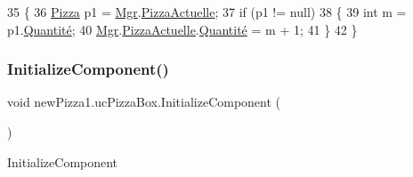 \begin{DoxyCode}
35         \{
36             \hyperlink{classModele_1_1Pizza}{Pizza} p1 = \hyperlink{classnewPizza1_1_1ucPizzaBox_a236b692b1cd3447fc57d5ddfcbea57fc}{Mgr}.\hyperlink{classModele_1_1Manager_a7e69844aeeebbc80144850efc0d2b94c}{PizzaActuelle};
37             \textcolor{keywordflow}{if} (p1 != null)
38             \{
39                 \textcolor{keywordtype}{int} m = p1.\hyperlink{classModele_1_1Pizza_ae755ca79feb6f9a522aa18544c3f1310}{Quantité};
40                 \hyperlink{classnewPizza1_1_1ucPizzaBox_a236b692b1cd3447fc57d5ddfcbea57fc}{Mgr}.\hyperlink{classModele_1_1Manager_a7e69844aeeebbc80144850efc0d2b94c}{PizzaActuelle}.\hyperlink{classModele_1_1Pizza_ae755ca79feb6f9a522aa18544c3f1310}{Quantité} = m + 1;
41             \}
42         \}
\end{DoxyCode}
\mbox{\label{classnewPizza1_1_1ucPizzaBox_a0bf3486ff05489987fc9b6766aec72d1}} 
\subsubsection{\texorpdfstring{Initialize\+Component()}{InitializeComponent()}\hspace{0.1cm}{\footnotesize\ttfamily [1/6]}}
{\footnotesize\ttfamily void new\+Pizza1.\+uc\+Pizza\+Box.\+Initialize\+Component (\begin{DoxyParamCaption}{ }\end{DoxyParamCaption})\hspace{0.3cm}{\ttfamily [inline]}}



Initialize\+Component 


